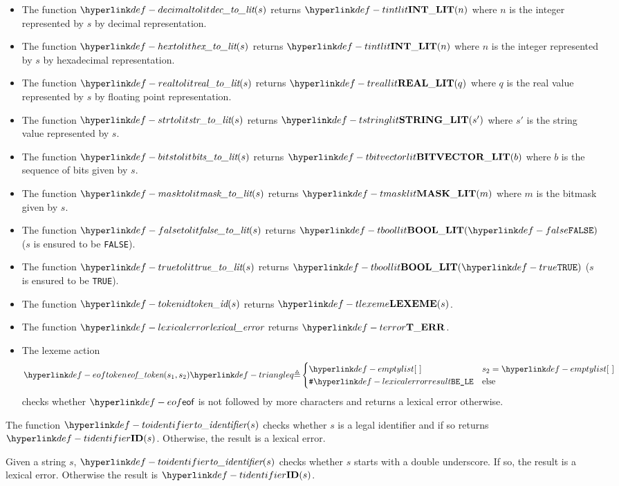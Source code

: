 \begin{itemize}
\hypertarget{def-decimaltolit}{}
\item The function $\decimaltolit(s)$ returns $\Tintlit(n)$ where $n$ is the integer represented by $s$
by decimal representation.
\hypertarget{def-hextolit}{}
\item The function $\hextolit(s)$ returns $\Tintlit(n)$ where $n$ is the integer represented by $s$
by hexadecimal representation.
\hypertarget{def-realtolit}{}
\item The function $\realtolit(s)$ returns $\Treallit(q)$ where $q$ is the real value represented by $s$
by floating point representation.
\hypertarget{def-strtolit}{}
\item The function $\strtolit(s)$ returns $\Tstringlit(s')$ where $s'$ is the string value represented by $s$.
\hypertarget{def-bitstolit}{}
\item The function $\bitstolit(s)$ returns $\Tbitvectorlit(b)$ where $b$ is the sequence of bits
given by $s$.
\hypertarget{def-masktolit}{}
\item The function $\masktolit(s)$ returns $\Tmasklit(m)$ where $m$ is the bitmask given by $s$.
\hypertarget{def-falsetolit}{}
\item The function $\falsetolit(s)$ returns $\Tboollit(\False)$ ($s$ is ensured to be \texttt{FALSE}).
\hypertarget{def-truetolit}{}
\item The function $\truetolit(s)$ returns $\Tboollit(\True)$ ($s$ is ensured to be \texttt{TRUE}).
\hypertarget{def-tokenid}{}
\item The function $\tokenid(s)$ returns $\Tlexeme(s)$.
\hypertarget{def-lexicalerror}{}
\item The function $\lexicalerror$ returns $\Terror$.
\hypertarget{def-eoftoken}{}
\item The lexeme action
\[
\eoftoken(s_1, s_2) \triangleq \begin{cases}
  \emptylist & s_2 = \emptylist\\
  \LexicalErrorConfig & \text{else}
\end{cases}
\]
checks whether $\eof$ is not followed by more characters and returns a lexical error otherwise.
\end{itemize}

\hypertarget{def-toidentifier}{}
The function $\toidentifier(s)$ checks whether $s$ is a legal identifier
and if so returns $\Tidentifier(s)$. Otherwise, the result is a lexical error.

\ProseParagraph
Given a string $s$, $\toidentifier(s)$ checks whether $s$ starts with a double
underscore. If so, the result is a lexical error. Otherwise the result is
$\Tidentifier(s)$.

